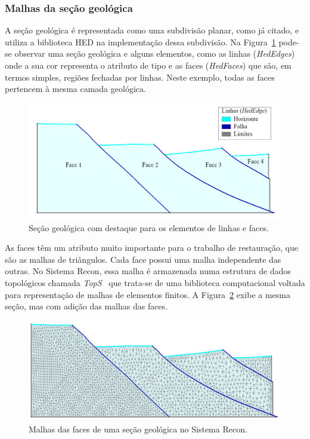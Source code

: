 \subsubsection{Malhas da seção geológica}

A seção geológica é representada como uma subdivisão planar, como já citado, e utiliza a biblioteca HED na implementação dessa subdivisão. Na Figura~\ref{fig-recon-2} pode-se observar uma seção geológica e alguns elementos, como as linhas (\textit{HedEdges}) onde a sua cor representa o atributo de tipo e as faces (\textit{HedFaces}) que são, em termos simples, regiões fechadas por linhas. Neste exemplo, todas as faces pertencem à mesma camada geológica.

\begin{figure} [h]
  \begin{center}
    \includegraphics[width=\textwidth]{images/fig-recon-2}
    \caption{Seção geológica com destaque para os elementos de linhas e faces.}\label{fig-recon-2}
  \end{center}
\end{figure}

As faces têm um atributo muito importante para o trabalho de restauração, que são as malhas de triângulos. Cada face possui uma malha independente das outras. No Sistema Recon, essa malha é armazenada numa estrutura de dados topológicos chamada \textit{TopS}~\cite{Tops} que trata-se de uma biblioteca computacional voltada para representação de malhas de elementos finitos. A Figura~\ref{fig-recon-3} exibe a mesma seção, mas com adição das malhas das faces.

\begin{figure} [H]
  \begin{center}
    \includegraphics[width=350pt]{images/fig-recon-3}
    \caption{Malhas das faces de uma seção geológica no Sistema Recon.}\label{fig-recon-3}
  \end{center}
\end{figure}

